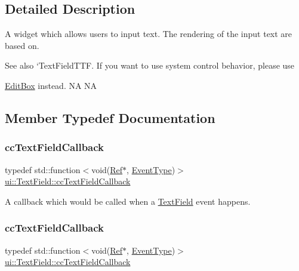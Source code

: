 \subsection{Detailed Description}
A widget which allows users to input text. The rendering of the input text are based on. 

\begin{DoxySeeAlso}{See also}
`\+Text\+Field\+T\+TF\textquotesingle{}. If you want to use system control behavior, please use 

{\ttfamily \hyperlink{classui_1_1EditBox}{Edit\+Box}} instead.  NA  NA 
\end{DoxySeeAlso}


\subsection{Member Typedef Documentation}
\mbox{\label{classui_1_1TextField_a8b58cb15659d59187cfa0586d1420f1f}} 
\subsubsection{\texorpdfstring{cc\+Text\+Field\+Callback}{ccTextFieldCallback}\hspace{0.1cm}{\footnotesize\ttfamily [1/2]}}
{\footnotesize\ttfamily typedef std\+::function$<$void(\hyperlink{classRef}{Ref}$\ast$, \hyperlink{classui_1_1TextField_aaa8ec638be6efea053beb57e5382ade9}{Event\+Type})$>$ \hyperlink{classui_1_1TextField_a8b58cb15659d59187cfa0586d1420f1f}{ui\+::\+Text\+Field\+::cc\+Text\+Field\+Callback}}

A callback which would be called when a \hyperlink{classui_1_1TextField}{Text\+Field} event happens. \mbox{\label{classui_1_1TextField_a8b58cb15659d59187cfa0586d1420f1f}} 
\subsubsection{\texorpdfstring{cc\+Text\+Field\+Callback}{ccTextFieldCallback}\hspace{0.1cm}{\footnotesize\ttfamily [2/2]}}
{\footnotesize\ttfamily typedef std\+::function$<$void(\hyperlink{classRef}{Ref}$\ast$, \hyperlink{classui_1_1TextField_aaa8ec638be6efea053beb57e5382ade9}{Event\+Type})$>$ \hyperlink{classui_1_1TextField_a8b58cb15659d59187cfa0586d1420f1f}{ui\+::\+Text\+Field\+::cc\+Text\+Field\+Callback}}

